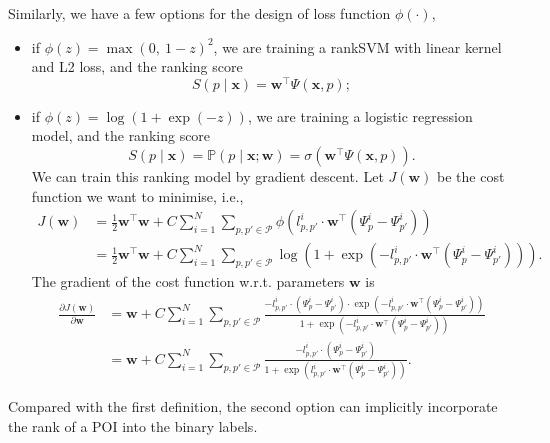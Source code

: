 Similarly, we have a few options for the design of loss function $\phi(\cdot)$,
\begin{itemize}
\item if $\phi(z) = \max(0,~ 1-z)^2$, we are training a rankSVM with linear kernel and L2 loss, and the ranking score 
      \begin{equation*}
      S(p \mid \mathbf{x})= \mathbf{w}^\top \Psi(\mathbf{x}, p);
      \end{equation*}
\item if $\phi(z) = \log(1 + \exp(-z))$, we are training a logistic regression model, and the ranking score
      \begin{equation*}
      S(p \mid \mathbf{x})= \mathbb{P}(p \mid \mathbf{x}; \mathbf{w}) = \sigma \left(\mathbf{w}^\top \Psi(\mathbf{x}, p) \right).
      \end{equation*}
      We can train this ranking model by gradient descent. Let $J(\mathbf{w})$ be the cost function we want to minimise, i.e.,
      \begin{align*}
      J(\mathbf{w})
      &= \frac{1}{2} \mathbf{w}^\top \mathbf{w} +  
         C \sum_{i=1}^N \sum_{p, p' \in \mathcal{P}} \phi \left( l_{p,p'}^i \cdot \mathbf{w}^\top (\Psi_p^i - \Psi_{p'}^i) \right) \\
      &= \frac{1}{2} \mathbf{w}^\top \mathbf{w} + 
         C \sum_{i=1}^N \sum_{p, p' \in \mathcal{P}} \log\left(1 + \exp\left(-l_{p,p'}^i \cdot \mathbf{w}^\top (\Psi_p^i - \Psi_{p'}^i) \right)\right).
      \end{align*}
      The gradient of the cost function w.r.t. parameters $\mathbf{w}$ is
      \begin{align*}
      \frac{\partial J(\mathbf{w})}{\partial \mathbf{w}} 
      &= \mathbf{w} + C \sum_{i=1}^N \sum_{p, p' \in \mathcal{P}} 
         \frac{-l_{p,p'}^i \cdot (\Psi_p^i - \Psi_{p'}^i) \cdot \exp\left( -l_{p,p'}^i \cdot \mathbf{w}^\top (\Psi_p^i - \Psi_{p'}^i) \right)}
              {1 + \exp\left( -l_{p,p'}^i \cdot \mathbf{w}^\top (\Psi_p^i - \Psi_{p'}^i) \right)} \\
      &= \mathbf{w} + C \sum_{i=1}^N \sum_{p, p' \in \mathcal{P}} 
         \frac{-l_{p,p'}^i \cdot (\Psi_p^i - \Psi_{p'}^i)}{1 + \exp\left( l_{p,p'}^i \cdot \mathbf{w}^\top (\Psi_p^i - \Psi_{p'}^i) \right)}.
      \end{align*} 
\end{itemize}

      
Compared with the first definition, the second option can implicitly incorporate the rank of a POI into the binary labels.




